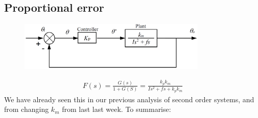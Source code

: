 \documentclass[class=report, crop=false, 12pt,a4paper]{standalone}
\begin{document}
\subsection{Proportional error}
\begin{figure}[H]
  \centerline{\includegraphics[width = 0.8\textwidth]{../img/diagram118.png}}
  \caption{}
\end{figure}
\begin{gather}
  F(s) = \frac{G(s)}{1+ G(S)} = \frac{k_p k_m}{Is^2 + fs + k_p k_m}
\end{gather}
We have already seen this in our previous analysis of second order systems, and from changing $k_m$ from last last week. To summarise:
\end{document}
